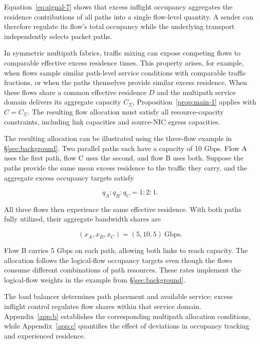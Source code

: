 Equation~\eqref{eq:signal-7} shows that excess inflight occupancy aggregates the residence contributions of all paths into a single flow-level quantity. A sender can therefore regulate its flow's total occupancy while the underlying transport independently selects packet paths.

In symmetric multipath fabrics, traffic mixing can expose competing flows to comparable effective excess residence times. This property arises, for example, when flows sample similar path-level service conditions with comparable traffic fractions, or when the paths themselves provide similar excess residence. When these flows share a common effective residence \(D\) and the multipath service domain delivers its aggregate capacity \(C_\Sigma\), Proposition~\ref{prop:main-1} applies with \(C=C_\Sigma\). The resulting flow allocation must satisfy all resource-capacity constraints, including link capacities and source-NIC egress capacities.

The resulting allocation can be illustrated using the three-flow example in \S\ref{sec:background}. Two parallel paths each have a capacity of 10 Gbps. Flow A uses the first path, flow C uses the second, and flow B uses both. Suppose the paths provide the same mean excess residence to the traffic they carry, and the aggregate excess occupancy targets satisfy

\[
q_A:q_B:q_C=1:2:1.
\]

All three flows then experience the same effective residence. With both paths fully utilized, their aggregate bandwidth shares are

\begin{equation}
\label{eq:signal-8}
\boxed{
(x_A,x_B,x_C)=(5,10,5)\ \mathrm{Gbps}.
}
\end{equation}

Flow B carries 5 Gbps on each path, allowing both links to reach capacity. The allocation follows the logical-flow occupancy targets even though the flows consume different combinations of path resources. These rates implement the logical-flow weights in the example from \S\ref{sec:background}.

The load balancer determines path placement and available service; excess inflight control regulates flow shares within that service domain. Appendix~\ref{app:b} establishes the corresponding multipath allocation conditions, while Appendix~\ref{app:c} quantifies the effect of deviations in occupancy tracking and experienced residence.
